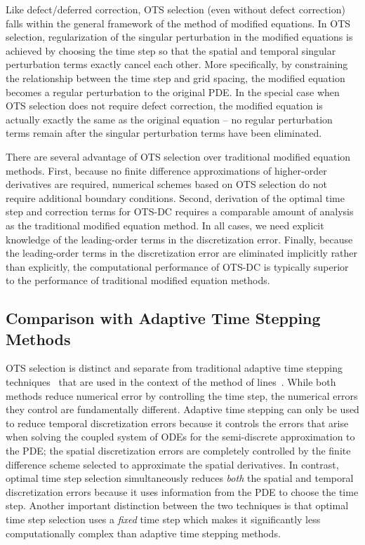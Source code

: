 \documentclass[fleqn,12pt,twoside]{article}
\begin{document}
Like defect/deferred correction, OTS selection (even without defect correction)
falls within the general framework of the method of modified equations.
In OTS selection, regularization of the singular perturbation in the modified
equations is achieved by choosing the time step so that the spatial and
temporal singular perturbation terms exactly cancel each other.  More
specifically, by constraining the relationship between the time step and
grid spacing, the modified equation becomes a regular perturbation to the
original PDE.  In the special case when OTS selection does not require
defect correction, the modified equation is actually exactly the same as the
original equation -- no regular perturbation terms remain after the singular
perturbation terms have been eliminated.

There are several advantage of OTS selection over traditional modified
equation methods.  First, because no finite difference approximations of
higher-order derivatives are required, numerical schemes based on OTS
selection do not require additional boundary conditions.  Second, derivation
of the optimal time step and correction terms for OTS-DC requires a comparable
amount of analysis as the traditional modified equation method.  In all cases,
we need explicit knowledge of the leading-order terms in the discretization
error.  Finally, because the leading-order terms in the discretization error
are eliminated implicitly rather than explicitly, the computational
performance of OTS-DC is typically superior to the performance of traditional
modified equation methods.


\subsection{Comparison with Adaptive Time Stepping Methods}
OTS selection is distinct and separate from traditional adaptive time stepping 
techniques~\cite{iserles_book,shampine_2005} that are used in the 
context of the method of lines~\cite{iserles_book,gko_book}.  
While both methods reduce numerical error by controlling the time step, the 
numerical errors they control are fundamentally different.  Adaptive time 
stepping can only be used to reduce temporal discretization errors because it 
controls the errors that arise when solving the coupled system of ODEs for the 
semi-discrete approximation to the PDE; the spatial discretization errors 
are completely controlled by the finite difference scheme selected to 
approximate the spatial derivatives.  
In contrast, optimal time step selection simultaneously reduces 
\emph{both} the spatial and temporal discretization errors because it
uses information from the PDE to choose the time step.  Another important 
distinction between the two techniques is that optimal time step selection 
uses a \emph{fixed} time step which makes it significantly less 
computationally complex than adaptive time stepping methods.
\end{document}
